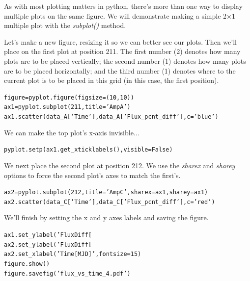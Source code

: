 As with most plotting matters in python, there's more than one way to 
display multiple plots on the same figure. We will demonstrate making
a simple 2$\times$1 multiple plot with the \textit{subplot()} method. 

Let's make a new figure, resizing it so we can better see our plots.
Then we'll place on the first plot at position 211. The first number (2) denotes 
how many plots are to be placed vertically; the second number (1) denotes
how many plots are to be placed horizontally; and the third number (1) denotes
where to the current plot is to be placed in this grid (in this case, the first position). 

\begin{alltt}
\pytab figure = pyplot.figure(figsize = (10,10))
\pytab ax1 = pyplot.subplot(211, title='Amp A')
\pytab ax1.scatter(data_A['Time'], data_A['Flux_pcnt_diff'], c='blue')
\end{alltt}

We can make the top plot's x-axis invisible... 

\begin{alltt}
\pytab pyplot.setp(ax1.get_xticklabels(), visible=False)
\end{alltt}

We next place the second plot at position 212. We use the \textit{sharex} and \textit{sharey} options
to force the second plot's  axes to match the first's.

\begin{alltt}
\pytab ax2 = pyplot.subplot(212, title='Amp C', sharex=ax1, sharey=ax1)
\pytab ax2.scatter(data_C['Time'], data_C['Flux_pcnt_diff'], c='red')
\end{alltt}

We'll finish by setting the x and y axes labels and saving the figure.

\begin{alltt}
\pytab ax1.set_ylabel('Flux Diff [%
\pytab ax2.set_ylabel('Flux Diff [%
\pytab ax2.set_xlabel('Time [MJD]', fontsize=15)
\pytab figure.show()
\pytab figure.savefig('flux_vs_time_4.pdf')
\end{alltt}

